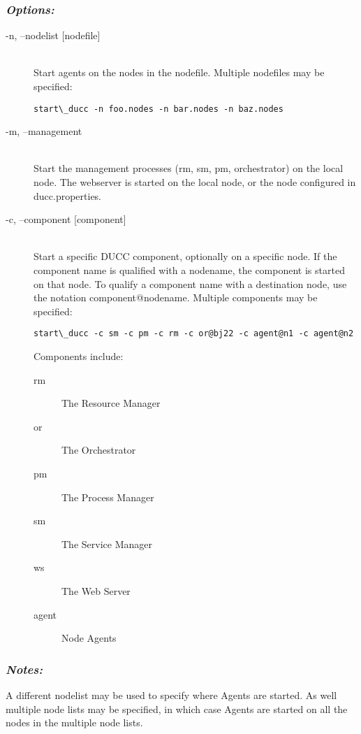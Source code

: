       \subsubsection{{\em Options: }}
      \begin{description}

        \item[-n, --nodelist {[nodefile] }] \hfill \\
          Start agents on the nodes in the nodefile. Multiple nodefiles may be specified: 
\begin{verbatim}
start\_ducc -n foo.nodes -n bar.nodes -n baz.nodes 
\end{verbatim}
          

        \item[-m, --management] \hfill \\
          Start the management processes (rm, sm, pm, orchestrator) on the local node. The 
          webserver is started on the local node, or the node configured in ducc.properties. 

        \item[-c, --component {[component] }] \hfill \\
          Start a specific DUCC component, optionally on a specific node. If the component 
          name is qualified with a nodename, the component is started on that node. To qualify 
          a component name with a destination node, use the notation component@nodename. 
          Multiple components may be specified: 
\begin{verbatim}
start\_ducc -c sm -c pm -c rm -c or@bj22 -c agent@n1 -c agent@n2 
\end{verbatim}
          
          Components include: 
          \begin{description}
            \item[rm] The Resource Manager
            \item[or]The Orchestrator
            \item[pm]The Process Manager
            \item[sm]The Service Manager
            \item[ws]The Web Server
            \item[agent]Node Agents
          \end{description}

      \end{description}

      \subsubsection{{\em Notes: }}
      A different nodelist may be used to specify where Agents are started. As well multiple node 
      lists may be specified, in which case Agents are started on all the nodes in the multiple node 
      lists. 
      
